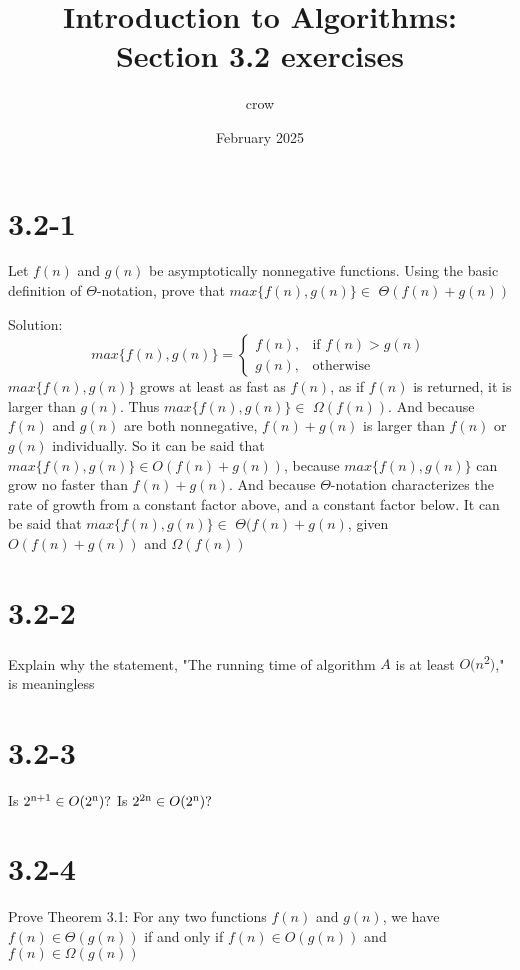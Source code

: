 \documentclass{article}
\title{Introduction to Algorithms: Section 3.2 exercises}
\author{crow}
\date{February 2025}
\begin{document}
\maketitle

\section{3.2-1}
\quad Let $f(n)$ and $g(n)$ be asymptotically nonnegative functions. Using the basic definition of $\Theta$-notation, prove that $max\{f(n),g(n)\} \in$ $\Theta$$(f(n) + g(n))$ \newline

Solution: 
\begin{equation}
    max\{f(n),g(n)\} =
        \begin{cases}
            f(n), & \text{if } f(n) > g(n)\\
            g(n), & \text{otherwise}
        \end{cases}
\end{equation}
\quad $max\{f(n),g(n)\}$ grows at least as fast as $f(n)$, as if $f(n)$ is returned, it is larger than $g(n)$. Thus $max\{f(n),g(n)\} \in$ $\Omega$$(f(n))$. And because $f(n)$ and $g(n)$ are both nonnegative, $f(n) + g(n)$ is larger than $f(n)$ or $g(n)$ individually. So it can be said that $max\{f(n),g(n)\} \in O(f(n) + g(n))$, because $max\{f(n),g(n)\}$ can grow no faster than $f(n) + g(n)$. And because $\Theta$-notation characterizes the rate of growth from a constant factor above, and a constant factor below. It can be said that $max\{f(n),g(n)\} \in$ $\Theta$$(f(n) + g(n)$, given $O(f(n) + g(n))$ and $\Omega$$(f(n))$

\section{3.2-2}
\quad Explain why the statement, "The running time of algorithm $A$ is at least $O(n$\textsuperscript{2}$)$," is meaningless

\section{3.2-3}
\quad Is $2\textsuperscript{n+1} \in O(2\textsuperscript{n})?$ Is $2\textsuperscript{2n} \in O(2\textsuperscript{n})?$

\section{3.2-4}
\quad Prove Theorem 3.1: \newline
For any two functions $f(n)$ and $g(n)$, we have $f(n) \in \Theta(g(n))$ if and only if $f(n) \in O(g(n))$ and $f(n) \in \Omega(g(n))$
\end{document}
